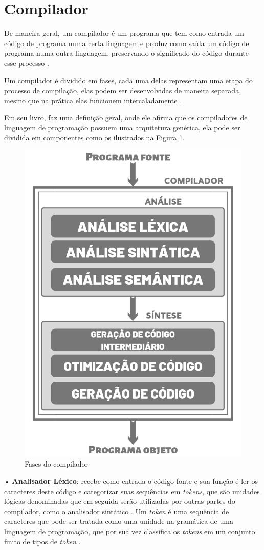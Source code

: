 \documentclass{bcc}
\begin{document}
\section{Compilador}

De maneira geral, um compilador é um programa que tem como entrada um código de programa numa certa linguagem e produz como saída um código de programa numa outra linguagem, preservando o significado do código durante esse processo \cite{grune2012}.

Um compilador é dividido em fases, cada uma delas representam uma etapa do processo de compilação, elas podem ser desenvolvidas de maneira separada, mesmo que na prática elas funcionem intercaladamente \cite{foleiss2009}. 

Em seu livro, \cite{somerville2003} faz uma definição geral, onde ele afirma que os compiladores de linguagem de programação possuem uma arquitetura genérica, ela pode ser dividida em componentes como os ilustrados na Figura \ref{fig:compiladorl}.

\begin{figure}[H]
\centering
\includegraphics[width=.6\textwidth]{Figuras/compilador.png}
\caption{Fases do compilador}
\label{fig:compiladorl}
\end{figure}

• \textbf{Analisador Léxico}: recebe como entrada o código fonte e sua função é ler os caracteres deste código e categorizar suas sequências em \textit{tokens}, que são unidades lógicas denominadas que em seguida serão utilizadas por outras partes do compilador, como o
analisador sintático \cite{foleiss2009}. Um \textit{token} é uma sequência de caracteres que pode ser tratada como uma unidade na gramática de uma linguagem de programação, que por sua vez classifica os \textit{tokens} em um conjunto finito de tipos de \textit{token} \cite{andrew2002}.
\end{document}

